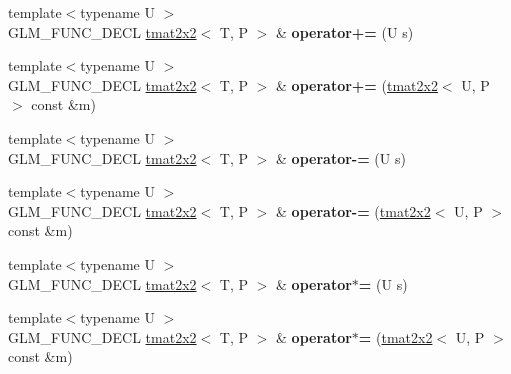 \begin{DoxyCompactItemize}
\item 
\mbox{\label{structglm_1_1tmat2x2_abbd5502504beec0048c05e969aaaeb11}} 
{\footnotesize template$<$typename U $>$ }\\G\+L\+M\+\_\+\+F\+U\+N\+C\+\_\+\+D\+E\+CL \hyperlink{structglm_1_1tmat2x2}{tmat2x2}$<$ T, P $>$ \& {\bfseries operator+=} (U s)
\item 
\mbox{\label{structglm_1_1tmat2x2_a2d82c9fdd02307411612b97393275f38}} 
{\footnotesize template$<$typename U $>$ }\\G\+L\+M\+\_\+\+F\+U\+N\+C\+\_\+\+D\+E\+CL \hyperlink{structglm_1_1tmat2x2}{tmat2x2}$<$ T, P $>$ \& {\bfseries operator+=} (\hyperlink{structglm_1_1tmat2x2}{tmat2x2}$<$ U, P $>$ const \&m)
\item 
\mbox{\label{structglm_1_1tmat2x2_aac5fa22c39a4a420d9639ca5702771e4}} 
{\footnotesize template$<$typename U $>$ }\\G\+L\+M\+\_\+\+F\+U\+N\+C\+\_\+\+D\+E\+CL \hyperlink{structglm_1_1tmat2x2}{tmat2x2}$<$ T, P $>$ \& {\bfseries operator-\/=} (U s)
\item 
\mbox{\label{structglm_1_1tmat2x2_ae7ef21b7c166f1d890d1e3e04b9da637}} 
{\footnotesize template$<$typename U $>$ }\\G\+L\+M\+\_\+\+F\+U\+N\+C\+\_\+\+D\+E\+CL \hyperlink{structglm_1_1tmat2x2}{tmat2x2}$<$ T, P $>$ \& {\bfseries operator-\/=} (\hyperlink{structglm_1_1tmat2x2}{tmat2x2}$<$ U, P $>$ const \&m)
\item 
\mbox{\label{structglm_1_1tmat2x2_a540b0eefa10666ec1b538ae89dfeddda}} 
{\footnotesize template$<$typename U $>$ }\\G\+L\+M\+\_\+\+F\+U\+N\+C\+\_\+\+D\+E\+CL \hyperlink{structglm_1_1tmat2x2}{tmat2x2}$<$ T, P $>$ \& {\bfseries operator$\ast$=} (U s)
\item 
\mbox{\label{structglm_1_1tmat2x2_a22ec14725c380635ddec8d3c9c856bcc}} 
{\footnotesize template$<$typename U $>$ }\\G\+L\+M\+\_\+\+F\+U\+N\+C\+\_\+\+D\+E\+CL \hyperlink{structglm_1_1tmat2x2}{tmat2x2}$<$ T, P $>$ \& {\bfseries operator$\ast$=} (\hyperlink{structglm_1_1tmat2x2}{tmat2x2}$<$ U, P $>$ const \&m)
\item 

\end{DoxyCompactItemize}
